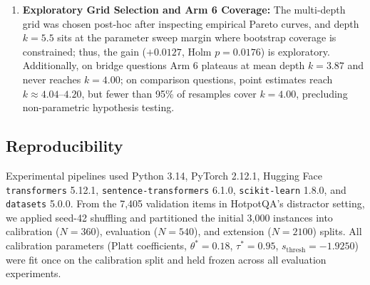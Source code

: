 \documentclass[conference]{IEEEtran}
\begin{document}
\begin{enumerate}
    \item \textbf{Exploratory Grid Selection and Arm 6 Coverage:} The multi-depth grid was chosen post-hoc after inspecting empirical Pareto curves, and depth $k=5.5$ sits at the parameter sweep margin where bootstrap coverage is constrained; thus, the gain ($+0.0127$, Holm $p=0.0176$) is exploratory. Additionally, on bridge questions Arm 6 plateaus at mean depth $k=3.87$ and never reaches $k=4.00$; on comparison questions, point estimates reach $k \approx 4.04\text{--}4.20$, but fewer than 95\% of resamples cover $k=4.00$, precluding non-parametric hypothesis testing.
\end{enumerate}

\subsection{Reproducibility}
Experimental pipelines used Python 3.14, PyTorch 2.12.1, Hugging Face \texttt{transformers} 5.12.1, \texttt{sentence-transformers} 6.1.0, \texttt{scikit-learn} 1.8.0, and \texttt{datasets} 5.0.0. From the 7,405 validation items in HotpotQA's distractor setting, we applied seed-42 shuffling and partitioned the initial 3,000 instances into calibration ($N=360$), evaluation ($N=540$), and extension ($N=2100$) splits. All calibration parameters (Platt coefficients, $\theta^*=0.18$, $\tau^*=0.95$, $s_{\text{thresh}}=-1.9250$) were fit once on the calibration split and held frozen across all evaluation experiments.

\balance
\end{document}
